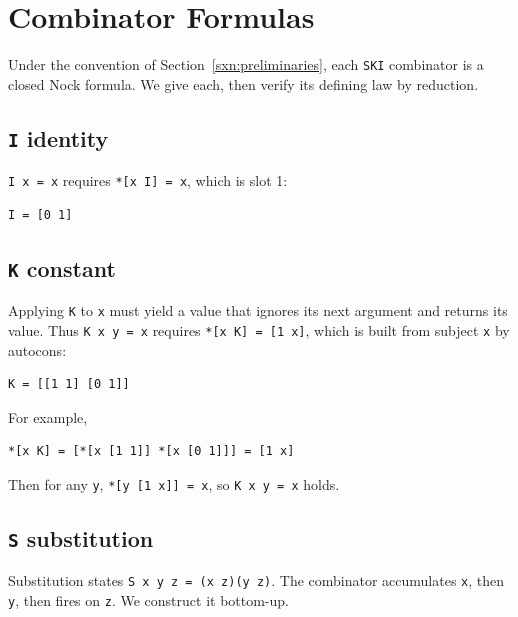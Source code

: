 \documentclass[twoside]{article}
\begin{document}
\section{Combinator Formulas}
\label{sxn:combinators}

Under the convention of Section~\ref{sxn:preliminaries}, each \texttt{SKI} combinator is a closed Nock formula.  We give each, then verify its defining law by reduction.

\subsection{\texttt{I} identity}

\lstinline[style=inlinecode]{I x = x} requires \lstinline[style=inlinecode]{*[x I] = x}, which is slot 1:

\begin{lstlisting}[style=listingblock]
I = [0 1]
\end{lstlisting}

\subsection{\texttt{K} constant}

Applying \lstinline[style=inlinecode]{K} to \lstinline[style=inlinecode]{x} must yield a value that ignores its next argument and returns its value.  Thus \lstinline[style=inlinecode]{K x y = x} requires \lstinline[style=inlinecode]{*[x K] = [1 x]}, which is built from subject \lstinline[style=inlinecode]{x} by autocons:

\begin{lstlisting}[style=listingblock]
K = [[1 1] [0 1]]
\end{lstlisting}

For example,

\begin{lstlisting}[style=listingblock]
*[x K] = [*[x [1 1]] *[x [0 1]]] = [1 x]
\end{lstlisting}

\noindent
Then for any \lstinline[style=inlinecode]{y}, \lstinline[style=inlinecode]{*[y [1 x]] = x}, so \lstinline[style=inlinecode]{K x y = x} holds.

\subsection{\texttt{S} substitution}

Substitution states \lstinline[style=inlinecode]{S x y z = (x z)(y z)}. The combinator accumulates \lstinline[style=inlinecode]{x}, then \lstinline[style=inlinecode]{y}, then fires on \lstinline[style=inlinecode]{z}. We construct it bottom-up.
\end{document}
